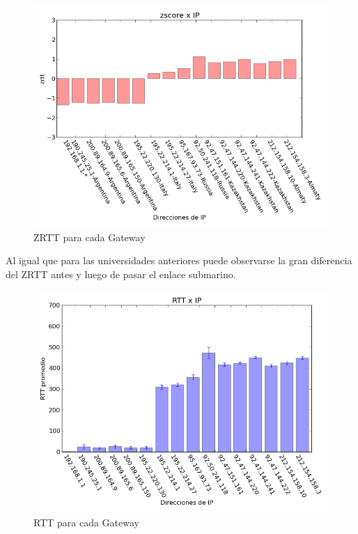 \begin{figure}[H]
	\begin{center}
		  \includegraphics[scale=0.5]{../graficos_informe/aipet_zscore.png}
		  \caption{ZRTT para cada Gateway}
		  \label{fig:contra1}
	\end{center}
\end{figure}

Al igual que para las universidades anteriores puede observarse la gran diferencia del ZRTT antes y luego de pasar el enlace submarino.

\begin{figure}[H]
	\begin{center}
		  \includegraphics[scale=0.5]{../graficos_informe/aipet_rtt.png}
		  \caption{RTT para cada Gateway}
		  \label{fig:contra1}
	\end{center}
\end{figure}

